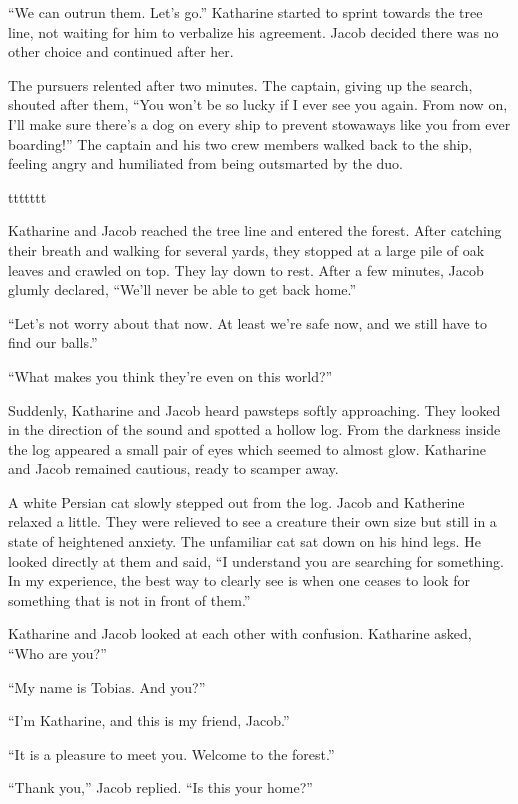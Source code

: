 “We can outrun them. Let's go.” Katharine started to sprint towards the tree line, not waiting for him to verbalize his agreement. Jacob decided there was no other choice and continued after her.

The pursuers relented after two minutes. The captain, giving up the search, shouted after them, “You won't be so lucky if I ever see you again. From now on, I'll make sure there's a dog on every ship to prevent stowaways like you from ever boarding!” The captain and his two crew members walked back to the ship, feeling angry and humiliated from being outsmarted by the duo.



ttttttt



Katharine and Jacob reached the tree line and entered the forest. After catching their breath and walking for several yards, they stopped at a large pile of oak leaves and crawled on top. They lay down to rest. After a few minutes, Jacob glumly declared, “We'll never be able to get back home.”

“Let's not worry about that now. At least we're safe now, and we still have to find our balls.”

“What makes you think they're even on this world?”

Suddenly, Katharine and Jacob heard pawsteps softly approaching. They looked in the direction of the sound and spotted a hollow log. From the darkness inside the log appeared a small pair of eyes which seemed to almost glow. Katharine and Jacob remained cautious, ready to scamper away.

A white Persian cat slowly stepped out from the log. Jacob and Katherine relaxed a little. They were relieved to see a creature their own size but still in a state of heightened anxiety. The unfamiliar cat sat down on his hind legs. He looked directly at them and said, “I understand you are searching for something. In my experience, the best way to clearly see is when one ceases to look for something that is not in front of them.”

Katharine and Jacob looked at each other with confusion. Katharine asked, “Who are you?”

“My name is Tobias. And you?”

“I'm Katharine, and this is my friend, Jacob.”

“It is a pleasure to meet you. Welcome to the forest.”

“Thank you,” Jacob replied. “Is this your home?”

